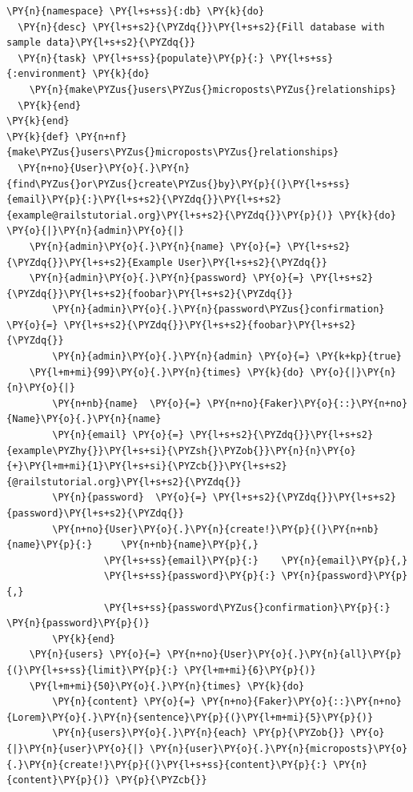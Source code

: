 \begin{codelisting}
\label{code:idempotentseed}
\begin{Verbatim}[fontsize=\relsize{-2.5},fontseries=b,commandchars=\\\{\}]
\PY{n}{namespace} \PY{l+s+ss}{:db} \PY{k}{do}
  \PY{n}{desc} \PY{l+s+s2}{\PYZdq{}}\PY{l+s+s2}{Fill database with sample data}\PY{l+s+s2}{\PYZdq{}}
  \PY{n}{task} \PY{l+s+ss}{populate}\PY{p}{:} \PY{l+s+ss}{:environment} \PY{k}{do}
    \PY{n}{make\PYZus{}users\PYZus{}microposts\PYZus{}relationships}
  \PY{k}{end}
\PY{k}{end}
\PY{k}{def} \PY{n+nf}{make\PYZus{}users\PYZus{}microposts\PYZus{}relationships}
  \PY{n+no}{User}\PY{o}{.}\PY{n}{find\PYZus{}or\PYZus{}create\PYZus{}by}\PY{p}{(}\PY{l+s+ss}{email}\PY{p}{:}\PY{l+s+s2}{\PYZdq{}}\PY{l+s+s2}{example@railstutorial.org}\PY{l+s+s2}{\PYZdq{}}\PY{p}{)} \PY{k}{do} \PY{o}{|}\PY{n}{admin}\PY{o}{|}
  	\PY{n}{admin}\PY{o}{.}\PY{n}{name} \PY{o}{=} \PY{l+s+s2}{\PYZdq{}}\PY{l+s+s2}{Example User}\PY{l+s+s2}{\PYZdq{}}
	\PY{n}{admin}\PY{o}{.}\PY{n}{password} \PY{o}{=} \PY{l+s+s2}{\PYZdq{}}\PY{l+s+s2}{foobar}\PY{l+s+s2}{\PYZdq{}}
        \PY{n}{admin}\PY{o}{.}\PY{n}{password\PYZus{}confirmation} \PY{o}{=} \PY{l+s+s2}{\PYZdq{}}\PY{l+s+s2}{foobar}\PY{l+s+s2}{\PYZdq{}}
        \PY{n}{admin}\PY{o}{.}\PY{n}{admin} \PY{o}{=} \PY{k+kp}{true}
	\PY{l+m+mi}{99}\PY{o}{.}\PY{n}{times} \PY{k}{do} \PY{o}{|}\PY{n}{n}\PY{o}{|}
	    \PY{n+nb}{name}  \PY{o}{=} \PY{n+no}{Faker}\PY{o}{::}\PY{n+no}{Name}\PY{o}{.}\PY{n}{name}
	    \PY{n}{email} \PY{o}{=} \PY{l+s+s2}{\PYZdq{}}\PY{l+s+s2}{example\PYZhy{}}\PY{l+s+si}{\PYZsh{}\PYZob{}}\PY{n}{n}\PY{o}{+}\PY{l+m+mi}{1}\PY{l+s+si}{\PYZcb{}}\PY{l+s+s2}{@railstutorial.org}\PY{l+s+s2}{\PYZdq{}}
	    \PY{n}{password}  \PY{o}{=} \PY{l+s+s2}{\PYZdq{}}\PY{l+s+s2}{password}\PY{l+s+s2}{\PYZdq{}}
	    \PY{n+no}{User}\PY{o}{.}\PY{n}{create!}\PY{p}{(}\PY{n+nb}{name}\PY{p}{:}     \PY{n+nb}{name}\PY{p}{,}
                 \PY{l+s+ss}{email}\PY{p}{:}    \PY{n}{email}\PY{p}{,}
                 \PY{l+s+ss}{password}\PY{p}{:} \PY{n}{password}\PY{p}{,}
                 \PY{l+s+ss}{password\PYZus{}confirmation}\PY{p}{:} \PY{n}{password}\PY{p}{)}
        \PY{k}{end}
	\PY{n}{users} \PY{o}{=} \PY{n+no}{User}\PY{o}{.}\PY{n}{all}\PY{p}{(}\PY{l+s+ss}{limit}\PY{p}{:} \PY{l+m+mi}{6}\PY{p}{)}
  	\PY{l+m+mi}{50}\PY{o}{.}\PY{n}{times} \PY{k}{do}
	    \PY{n}{content} \PY{o}{=} \PY{n+no}{Faker}\PY{o}{::}\PY{n+no}{Lorem}\PY{o}{.}\PY{n}{sentence}\PY{p}{(}\PY{l+m+mi}{5}\PY{p}{)}
	    \PY{n}{users}\PY{o}{.}\PY{n}{each} \PY{p}{\PYZob{}} \PY{o}{|}\PY{n}{user}\PY{o}{|} \PY{n}{user}\PY{o}{.}\PY{n}{microposts}\PY{o}{.}\PY{n}{create!}\PY{p}{(}\PY{l+s+ss}{content}\PY{p}{:} \PY{n}{content}\PY{p}{)} \PY{p}{\PYZcb{}}

\end{Verbatim}
\end{codelisting}
